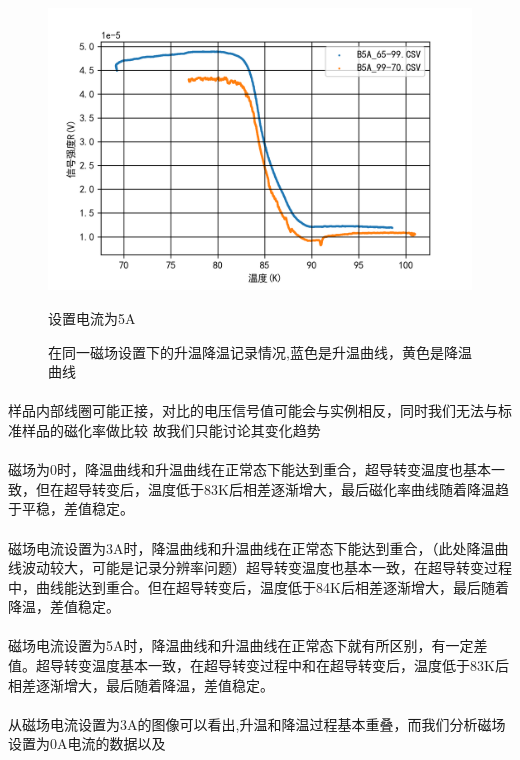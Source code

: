 \documentclass{ctexart}                                     %
\theoremstyle{ansstyle}
\begin{document}
\begin{figure}[H]
\begin{minipage}[t]{0.6\linewidth}
        \includegraphics[width=0.9\linewidth]{./png/8.png}
        \caption{设置电流为5A}
    \end{minipage}
    \caption{在同一磁场设置下的升温降温记录情况,蓝色是升温曲线，黄色是降温曲线}

\end{figure}
\paragraph{}样品内部线圈可能正接，对比的电压信号值可能会与实例相反，同时我们无法与标准样品的磁化率做比较
故我们只能讨论其变化趋势\\
\paragraph{}磁场为0时，降温曲线和升温曲线在正常态下能达到重合，超导转变温度也基本一致，但在超导转变后，温度低于83K后相差逐渐增大，最后磁化率曲线随着降温趋于平稳，差值稳定。\\
\paragraph{}磁场电流设置为3A时，降温曲线和升温曲线在正常态下能达到重合，（此处降温曲线波动较大，可能是记录分辨率问题）超导转变温度也基本一致，在超导转变过程中，曲线能达到重合。但在超导转变后，温度低于84K后相差逐渐增大，最后随着降温，差值稳定。\\
\paragraph{}磁场电流设置为5A时，降温曲线和升温曲线在正常态下就有所区别，有一定差值。超导转变温度基本一致，在超导转变过程中和在超导转变后，温度低于83K后相差逐渐增大，最后随着降温，差值稳定。
\paragraph{}
从磁场电流设置为3A的图像可以看出,升温和降温过程基本重叠，而我们分析磁场设置为0A电流的数据以及
\end{document}
